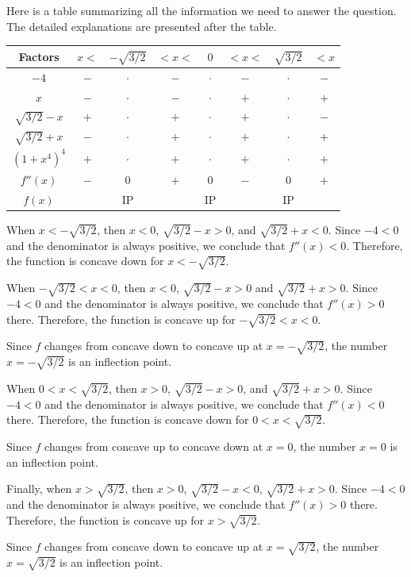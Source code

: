 \begin{enumerate}[label=(\alph*)]
	Here is a table summarizing all the information we need to answer the question. The detailed explanations are presented after the table.
	\begin{center}
	\begin{tabular}{c||c|c|c|c|c|c|c}
	Factors & \phantom{22} $x < $ \phantom{22} & $-\sqrt{3/2}$ & \phantom{22} $< x < $ \phantom{22} & $0$ & \phantom{22} $< x < $ \phantom{22} & $\sqrt{3/2}$ & \phantom{22} $< x$ \phantom{22} \\\hline
	$-4$ & $-$ & $\cdot$ & $-$ & $\cdot$ & $-$ & $\cdot$ & $-$ \\
	$x$ & $-$ & $\cdot$ & $-$ & $\cdot$ & $+$ & $\cdot$ & $+$ \\
	$\sqrt{3/2} - x$ & $+$ & $\cdot$ & $+$ & $\cdot$ & $+$ & $\cdot$ & $-$ \\
	$\sqrt{3/2} + x$ & $-$& $\cdot$ & $+$ & $\cdot$ & $+$ & $\cdot$ & $+$ \\
	$(1 + x^4)^4$ & $+$ & $\cdot$ & $+$ & $\cdot$ & $+$ & $\cdot$ & $+$ \\\hline
	$f''(x)$ & $-$ & $0$ & $+$ & $0$ & $-$ & $0$ & $+$ \\
	$f(x)$ & \CVdown & IP & \CVup & IP & \CVdown & IP & \CVup
	\end{tabular}
	\end{center}
	
	When $x < -\sqrt{3/2}$, then $x < 0$, $\sqrt{3/2} - x > 0$, and $\sqrt{3/2} + x < 0$. Since $-4 < 0$ and the denominator is always positive, we conclude that $f''(x) < 0$. Therefore, the function is concave down for $x < -\sqrt{3/2}$.
	
	When $-\sqrt{3/2} < x < 0$, then $x < 0$, $\sqrt{3/2} - x > 0$ and $\sqrt{3/2} + x > 0$. Since $-4 < 0$ and the denominator is always positive, we conclude that $f''(x) > 0$ there. Therefore, the function is concave up for $-\sqrt{3/2} < x < 0$. 
	
	Since $f$ changes from concave down to concave up at $x = -\sqrt{3/2}$, the number $x = -\sqrt{3/2}$ is an inflection point.
	
	When $0 < x < \sqrt{3/2}$, then $x > 0$, $\sqrt{3/2} - x > 0$, and $\sqrt{3/2} + x > 0$. Since $-4 < 0$ and the denominator is always positive, we conclude that $f''(x) < 0$ there. Therefore, the function is concave  down for $0 < x < \sqrt{3/2}$.
	
	Since $f$ changes from concave up to concave down at $x = 0$, the number $x = 0$ is an inflection point.
	
	Finally, when $x > \sqrt{3/2}$, then $x > 0$, $\sqrt{3/2} - x < 0$, $\sqrt{3/2} + x > 0$. Since $-4 < 0$ and the denominator is always positive, we conclude that $f''(x) > 0$ there. Therefore, the function is concave up for $x > \sqrt{3/2}$.
	
	Since $f$ changes from concave down to concave up at $x = \sqrt{3/2}$, the number $x = \sqrt{3/2}$ is an inflection point.
	\end{enumerate}
	
